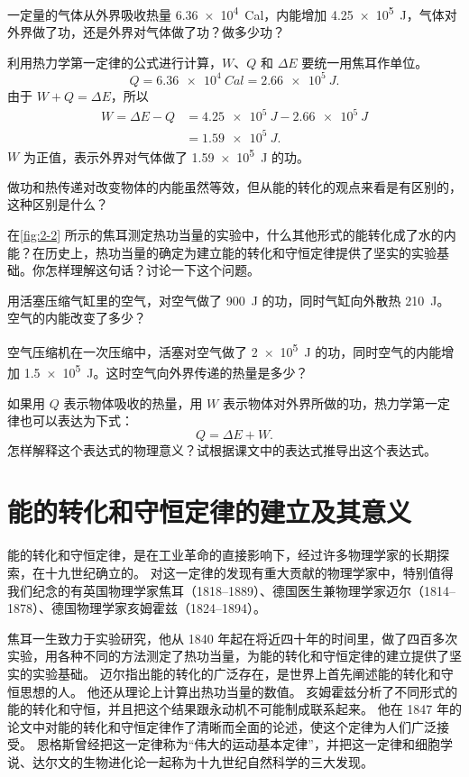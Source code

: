 \begin{example}
一定量的气体从外界吸收热量 \qty{6.36e4}{Cal}，内能增加 \qty{4.25e5}{J}，气体对外界做了功，还是外界对气体做了功？做多少功？	
\end{example}

\begin{solution}
利用热力学第一定律的公式进行计算，$W$、$Q$ 和 $\Delta E$ 要统一用焦耳作单位。
\[Q=\qty{6.36e4}{Cal}=\qty{2.66e5}{J}.\]
由于 $W+Q=\Delta E$，所以
\[\begin{split}
W=\Delta E-Q&=\qty{4.25e5}{J}-\qty{2.66e5}{J}\\
&=\qty{1.59e5}{J}.
\end{split} \]
$W$ 为正值，表示外界对气体做了 \qty{1.59e5}{J} 的功。
\end{solution}

\begin{Practice}
\begin{question}
	\item 做功和热传递对改变物体的内能虽然等效，但从能的转化的观点来看是有区别的，这种区别是什么？
	\item 在\cref{fig:2-2} 所示的焦耳测定热功当量的实验中，什么其他形式的能转化成了水的内能？在历史上，热功当量的确定为建立能的转化和守恒定律提供了坚实的实验基础。你怎样理解这句话？讨论一下这个问题。
	\item 用活塞压缩气缸里的空气，对空气做了 \qty{900}{J} 的功，同时气缸向外散热 \qty{210}{J}。空气的内能改变了多少？
	\item 空气压缩机在一次压缩中，活塞对空气做了 \qty{2e5}{J} 的功，同时空气的内能增加 \qty{1.5e5}{J}。这时空气向外界传递的热量是多少？
	\item 如果用 $Q$ 表示物体吸收的热量，用 $W$ 表示物体对外界所做的功，热力学第一定律也可以表达为下式：
	\[Q=\Delta E+W.\]
	怎样解释这个表达式的物理意义？试根据课文中的表达式推导出这个表达式。
\end{question}
\end{Practice}

\section{能的转化和守恒定律的建立及其意义}
能的转化和守恒定律，是在工业革命的直接影响下，经过许多物理学家的长期探索，在十九世纪确立的。
对这一定律的发现有重大贡献的物理学家中，特别值得我们纪念的有英国物理学家焦耳（1818--1889）、德国医生兼物理学家迈尔（1814--1878）、德国物理学家亥姆霍兹（1824--1894）。

焦耳一生致力于实验研究，他从 1840 年起在将近四十年的时间里，做了四百多次实验，用各种不同的方法测定了热功当量，为能的转化和守恒定律的建立提供了坚实的实验基础。
迈尔指出能的转化的广泛存在，是世界上首先阐述能的转化和守恒思想的人。
他还从理论上计算出热功当量的数值。
亥姆霍兹分析了不同形式的能的转化和守恒，并且把这个结果跟永动机不可能制成联系起来。
他在 1847 年的论文中对能的转化和守恒定律作了清晰而全面的论述，使这个定律为人们广泛接受。
恩格斯曾经把这一定律称为“伟大的运动基本定律”，并把这一定律和细胞学说、达尔文的生物进化论一起称为十九世纪自然科学的三大发现。

